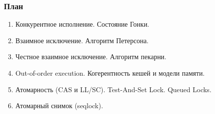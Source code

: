 \begin{frame}
\frametitle{План}

\begin{enumerate}
  \item Конкурентное исполнение. Состояние Гонки.
  \item Взаимное исключение. Алгоритм Петерсона.
  \item Честное взаимное исключение. Алгоритм пекарни.
  \item Out-of-order execution. Когерентность кешей и модели памяти.
  \item Атомарность (CAS и LL/SC). Test-And-Set Lock. Queued Locks.
  \item Атомарный снимок (seqlock).
\end{enumerate}
\end{frame}

